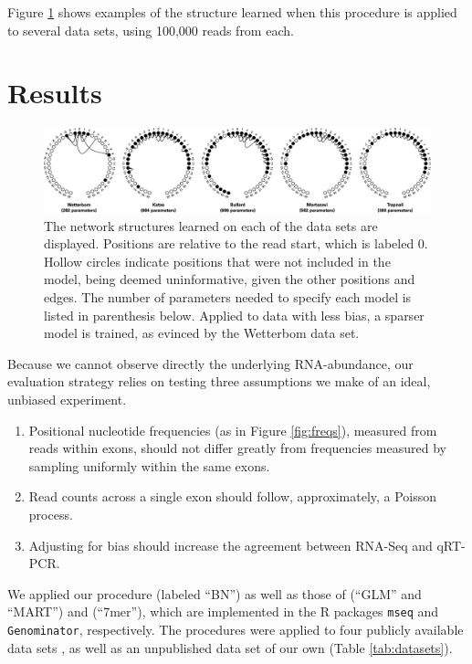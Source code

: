 \documentclass{bioinfo}
\begin{document}
Figure \ref{fig:models} shows examples of the structure learned when this
procedure is applied to several data sets, using 100,000 reads from each.


\section{Results}

\begin{figure}
\centerline{\includegraphics[width=\textwidth]{models.eps}}
\caption{
The network structures learned on each of the data sets are displayed. Positions
are relative to the read start, which is labeled 0. Hollow circles indicate
positions that were not included in the model, being deemed uninformative, given
the other positions and edges. The number of parameters needed to
specify each model is listed in parenthesis below. Applied to data with less
bias, a sparser model is trained, as evinced by the Wetterbom data set.
}
\label{fig:models}
\end{figure}


Because we cannot observe directly the underlying RNA-abundance, our evaluation
strategy relies on testing three assumptions we make of an ideal, unbiased experiment.
\begin{enumerate}
\item Positional nucleotide frequencies (as in Figure \ref{fig:freqs}), measured
from reads within exons, should not differ greatly from frequencies measured by
sampling uniformly within the same exons.
\item Read counts across a single exon should follow, approximately, a Poisson
process.
\item Adjusting for bias should increase the agreement between RNA-Seq and
qRT-PCR.
\end{enumerate}

We applied our procedure (labeled ``BN'') as well as those of
\citet{Li2010} (``GLM'' and ``MART'') and \citet{Hansen2010} (``7mer''), which
are implemented in the R packages \texttt{mseq} and \texttt{Genominator},
respectively. The procedures were applied to four publicly available data
sets \citep{Bullard2010, Mortazavi2008, Trapnell2010, Wetterbom2010}, as well as
an unpublished data set of our own (Table \ref{tab:datasets}).
\end{document}

